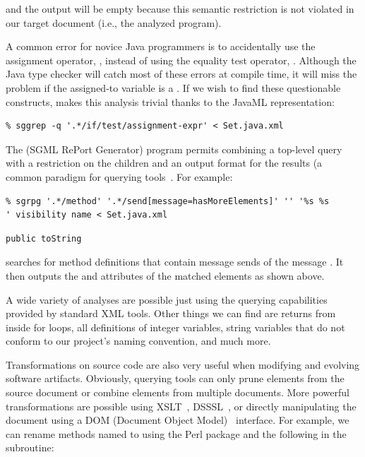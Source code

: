 \documentclass{article}
\begin{document}
and the output will be empty because this semantic restriction is not
violated in our target document (i.e., the analyzed program).

A common error for novice Java programmers is to accidentally use the
assignment operator, \smtexttt{=}, instead of using the equality test
operator, \smtexttt{==}.  Although the Java type checker will catch
most of these errors at compile time, it will miss the problem if
the assigned-to variable is a . If we wish to find these
questionable constructs,  makes this analysis
trivial thanks to the JavaML representation:

\begin{verbatim}
% sggrep -q '.*/if/test/assignment-expr' < Set.java.xml
\end{verbatim}

The  (SGML RePort Generator) program permits combining
a top-level query with a restriction on the children and an output
format for the results (a common paradigm for querying
tools~\cite{XMLQL-EnE}. For example:

\begin{verbatim}
% sgrpg '.*/method' '.*/send[message=hasMoreElements]' '' '%s %s 
' visibility name < Set.java.xml
\end{verbatim}
\begin{verbatim}
public toString
\end{verbatim}

\noindent searches for method definitions that contain message sends of the
message .  It then outputs the
 and  attributes of the
matched elements as shown above.

A wide variety of analyses are possible just using the querying
capabilities provided by standard XML tools.  Other things we can find
are returns from inside for loops, all definitions of integer variables,
string variables that do not conform to our project's naming convention,
and much more.

Transformations on source code are also very useful when modifying and
evolving software artifacts.  Obviously, querying tools can only prune
elements from the source document or combine elements from multiple 
documents.  More powerful transformations are
possible using XSLT~\cite{XSLT}, DSSSL~\cite{DSSSL}, or
directly manipulating the document using a DOM (Document Object
Model)~\cite{DOM} interface.  For example, we can rename methods named
 to  using the Perl package 
 and the following in the
 subroutine:
\end{document}
